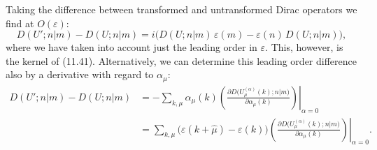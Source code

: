 Taking the difference between transformed and untransformed Dirac operators
we find at $O(\varepsilon)$:
\begin{equation}
D(U'; n|m) - D(U; n|m)
= i\bigl(D(U; n|m)\,\varepsilon(m) - \varepsilon(n)\, D(U; n|m)\bigr) ,
\end{equation}
where we have taken into account just the leading order in $\varepsilon$. This, however,
is the kernel of (11.41). Alternatively, we can determine this leading order
difference also by a derivative with regard to $\alpha_\mu$:
\begin{equation}
\begin{aligned}
D(U'; n|m) - D(U; n|m)
&= -\sum_{k,\mu} \alpha_\mu(k)
\left.\left(\frac{\partial D\bigl(U_\mu^{(\alpha)}(k); n|m\bigr)}
{\partial\alpha_\mu(k)}\right)\right|_{\alpha=0} \\
&= \sum_{k,\mu} \bigl(\varepsilon(k + \hat{\mu}) - \varepsilon(k)\bigr)
\left.\left(\frac{\partial D\bigl(U_\mu^{(\alpha)}(k); n|m\bigr)}
{\partial\alpha_\mu(k)}\right)\right|_{\alpha=0} .
\end{aligned}
\end{equation}

